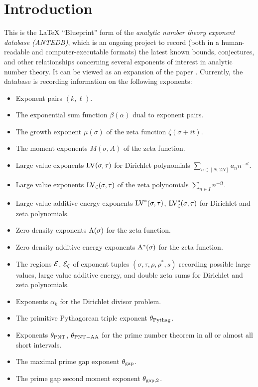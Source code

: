 \chapter{Introduction}\label{intro-chapter}

This is the LaTeX ``Blueprint'' form of the \emph{analytic number theory exponent database (ANTEDB)}, which is an ongoing project to record (both in a human-readable and computer-executable formats) the latest known bounds, conjectures, and other relationships concerning several exponents of interest in analytic number theory.  It can be viewed as an expansion of the paper \cite{trudgian-yang}. Currently, the database is recording information on the following exponents:

\begin{itemize}
\item Exponent pairs $(k,\ell)$.
\item The exponential sum function $\beta(\alpha)$ dual to exponent pairs.
\item The growth exponent $\mu(\sigma)$ of the zeta function $\zeta(\sigma+it)$.
\item The moment exponents $M(\sigma,A)$ of the zeta function.
\item Large value exponents $\mathrm{LV}(\sigma, \tau)$ for Dirichlet polynomials $\sum_{n \in [N,2N]} a_n n^{-it}$.
\item Large value exponents $\mathrm{LV}_\zeta(\sigma, \tau)$ of the zeta polynomials $\sum_{n \in I} n^{-it}$.
\item Large value additive energy exponents $\mathrm{LV}^*(\sigma, \tau)$, $\mathrm{LV}^*_\zeta(\sigma, \tau)$ for Dirichlet and zeta polynomials.
\item Zero density exponents $\mathrm{A}(\sigma)$ for the zeta function.
\item Zero density additive energy exponents $\mathrm{A}^*(\sigma)$ for the zeta function.
\item The regions $\mathcal{E}$, $\mathcal{E}_\zeta$ of exponent tuples $(\sigma,\tau,\rho,\rho^*,s)$ recording possible large values, large value additive energy, and double zeta sums for Dirichlet and zeta polynomials.
\item Exponents $\alpha_k$ for the Dirichlet divisor problem.
\item The primitive Pythagorean triple exponent $\theta_{\mathrm{Pythag}}$.
\item Exponents $\theta_{\mathrm{PNT}}$, $\theta_{\mathrm{PNT-AA}}$ for the prime number theorem in all or almost all short intervals.
\item The maximal prime gap exponent $\theta_{\mathrm{gap}}$.
\item The prime gap second moment exponent $\theta_{\mathrm{gap},2}$.
\end{itemize}

